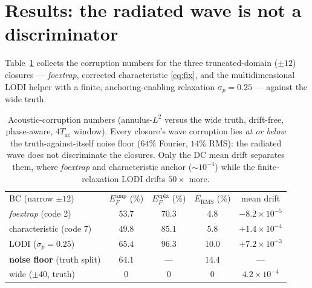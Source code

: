 \documentclass{jfm}
\begin{document}
\section{Results: the radiated wave is not a discriminator}\label{sec:cvpresults}
Table~\ref{tab:cvp} collects the corruption numbers for the three
truncated-domain ($\pm12$) closures --- \textit{foextrap}, corrected
characteristic \eqref{eq:fix}, and the multidimensional LODI helper with a
finite, anchoring-enabling relaxation $\sigma_p=0.25$ --- against the wide
truth.

\begin{table}
  \centering
  \begin{tabular}{lcccc}
    BC (narrow $\pm12$) & $E_F^{\mathrm{amp}}$ (\%) & $E_F^{\mathrm{cplx}}$ (\%)
      & $E_{\mathrm{RMS}}$ (\%) & mean drift\\[3pt]
    \textit{foextrap} (code 2)       & $53.7$ & $70.3$ & $4.8$  & $-8.2\times10^{-5}$\\
    characteristic (code 7)          & $49.8$ & $85.1$ & $5.8$  & $+1.4\times10^{-4}$\\
    LODI ($\sigma_p{=}0.25$)         & $65.4$ & $96.3$ & $10.0$ & $+7.2\times10^{-3}$\\[3pt]
    \textbf{noise floor} (truth split)& $\mathbf{64.1}$ & --- & $\mathbf{14.4}$ & ---\\
    wide ($\pm40$, truth)            & $0$ & $0$ & $0$ & $4.2\times10^{-4}$\\
  \end{tabular}
  \caption{Acoustic-corruption numbers (annulus-$L^2$ versus the wide truth,
  drift-free, phase-aware, $4T_{\mathrm{ac}}$ window). Every closure's wave
  corruption lies \emph{at or below} the truth-against-itself noise floor
  ($64\%$ Fourier, $14\%$ RMS): the radiated wave does not discriminate the
  closures. Only the DC mean drift separates them, where \textit{foextrap} and
  characteristic anchor ($\sim10^{-4}$) while the finite-relaxation LODI drifts
  $50\times$ more.}
  \label{tab:cvp}
\end{table}
\end{document}

